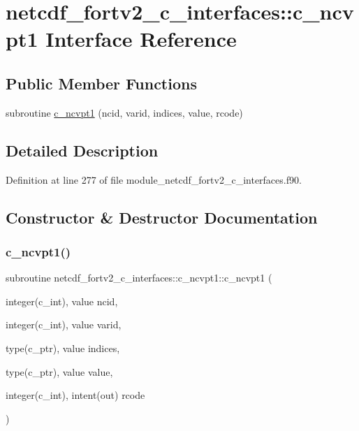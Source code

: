 \hypertarget{interfacenetcdf__fortv2__c__interfaces_1_1c__ncvpt1}{}\section{netcdf\+\_\+fortv2\+\_\+c\+\_\+interfaces\+:\+:c\+\_\+ncvpt1 Interface Reference}
\label{interfacenetcdf__fortv2__c__interfaces_1_1c__ncvpt1}
\subsection*{Public Member Functions}
\begin{DoxyCompactItemize}
\item 
subroutine \hyperlink{interfacenetcdf__fortv2__c__interfaces_1_1c__ncvpt1_a2afdad721775bf209d7d20ee9b31fcc2}{c\+\_\+ncvpt1} (ncid, varid, indices, value, rcode)
\end{DoxyCompactItemize}


\subsection{Detailed Description}


Definition at line 277 of file module\+\_\+netcdf\+\_\+fortv2\+\_\+c\+\_\+interfaces.\+f90.



\subsection{Constructor \& Destructor Documentation}
\mbox{\label{interfacenetcdf__fortv2__c__interfaces_1_1c__ncvpt1_a2afdad721775bf209d7d20ee9b31fcc2}} 
\subsubsection{\texorpdfstring{c\+\_\+ncvpt1()}{c\_ncvpt1()}}
{\footnotesize\ttfamily subroutine netcdf\+\_\+fortv2\+\_\+c\+\_\+interfaces\+::c\+\_\+ncvpt1\+::c\+\_\+ncvpt1 (\begin{DoxyParamCaption}\item[{integer(c\+\_\+int), value}]{ncid,  }\item[{integer(c\+\_\+int), value}]{varid,  }\item[{type(c\+\_\+ptr), value}]{indices,  }\item[{type(c\+\_\+ptr), value}]{value,  }\item[{integer(c\+\_\+int), intent(out)}]{rcode }\end{DoxyParamCaption})}



